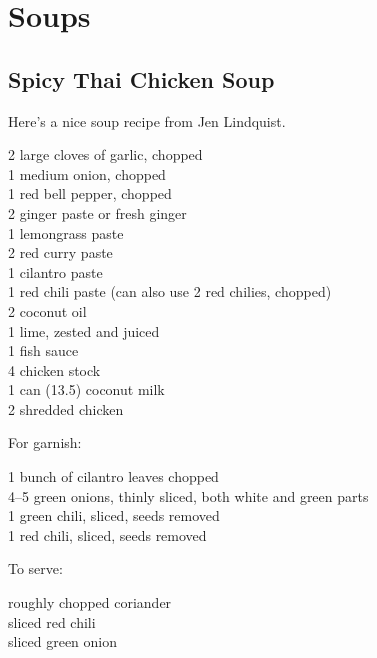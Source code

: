 \chapter{Soups}

\section{Spicy Thai Chicken Soup}

\begin{open}
    Here's a nice soup recipe from Jen Lindquist.
\end{open}
\begin{ingredients}
    2 large cloves of garlic, chopped\\
    1 medium onion, chopped\\
    1 red bell pepper, chopped\\
    \SI{2}{\tblspoon} ginger paste or fresh ginger\\
    \SI{1}{\tblspoon} lemongrass paste\\
    \SI{2}{\tblspoon} red curry paste\\
    \SI{1}{\tblspoon} cilantro paste\\
    \SI{1}{\tblspoon} red chili paste (can also use 2 red chilies, chopped)\\
    \SI{2}{\tblspoon} coconut oil\\
    1 lime, zested and juiced\\
    \SI{1}{\tblspoon} fish sauce\\
    \SI{4}{\cup} chicken stock\\
    1 can (\SI{13.5}{\fluidounce}) coconut milk\\
    \SI{2}{\cup} shredded chicken
\end{ingredients}
For garnish:
\begin{ingredients}
    1 bunch of cilantro leaves chopped\\
    \numrange{4}{5} green onions, thinly sliced, both white and green parts\\
    1 green chili, sliced, seeds removed\\
    1 red chili, sliced, seeds removed
\end{ingredients}
To serve:
\begin{ingredients}
    roughly chopped coriander\\
    sliced red chili\\
    sliced green onion
\end{ingredients}
